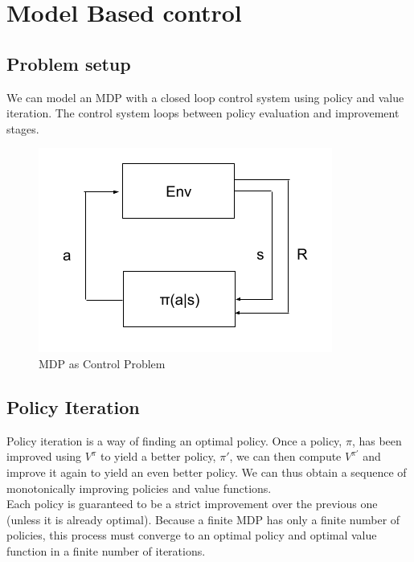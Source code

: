 \documentclass[11pt]{article}
\begin{document}


        

\section{Model Based control}

\subsection{Problem setup}
We can model an MDP with a closed loop control system using policy and value iteration. The control system loops between policy evaluation and improvement stages.

\begin{figure}[H]
    \centering
    \includegraphics[width=0.4\linewidth]{model based.png}
    \caption{MDP as Control Problem}
    \label{fig:my_label}
\end{figure}

\subsection{Policy Iteration}
Policy iteration is a way of finding an optimal policy. Once a policy, $\pi$, has been improved using $V^{\pi}$ to yield a better policy, $\pi'$, we can then compute $V^{\pi'}$ and improve it again to yield an even better policy. We can thus obtain a sequence of monotonically improving policies and value functions.\\
Each policy is guaranteed to be a strict improvement over the previous one (unless it is already optimal). Because a finite MDP has only a finite number of policies, this process must converge to an optimal policy and optimal value function in a finite number of iterations.
\end{document}

